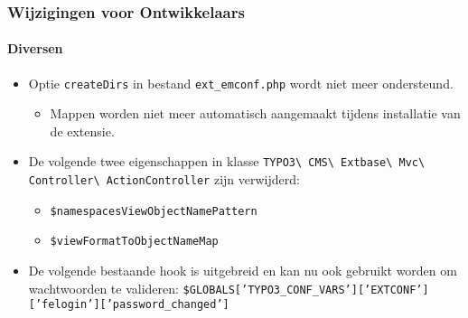 \begin{frame}[fragile]
	\frametitle{Wijzigingen voor Ontwikkelaars}
	\framesubtitle{Diversen}

	\begin{itemize}
		\item Optie \texttt{createDirs} in bestand \texttt{ext\_emconf.php} wordt niet meer ondersteund.

			\begin{itemize}\smaller
				\item[\ding{228}] Mappen worden niet meer automatisch aangemaakt tijdens installatie van de extensie.
			\end{itemize}\normalsize

		\item De volgende twee eigenschappen in klasse
			\texttt{TYPO3\textbackslash
				CMS\textbackslash
				Extbase\textbackslash
				Mvc\textbackslash
				Controller\textbackslash
				ActionController}\newline
			zijn verwijderd:

			\begin{itemize}
				\item \texttt{\$namespacesViewObjectNamePattern}
				\item \texttt{\$viewFormatToObjectNameMap}
			\end{itemize}

		\item De volgende bestaande hook is uitgebreid en kan nu
			ook gebruikt worden om wachtwoorden te valideren:\newline
			{\fontsize{8}{10} \selectfont \texttt{\$GLOBALS['TYPO3\_CONF\_VARS']['EXTCONF']['felogin']['password\_changed']}}

	\end{itemize}

\end{frame}


